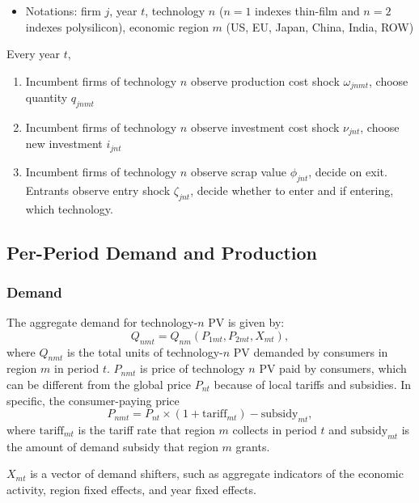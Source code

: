 \documentclass[12pt]{article}
\begin{document}
\begin{itemize}
    \item Notations: firm $j$, year $t$, technology $n$ ($n=1$ indexes thin-film and $n=2$ indexes polysilicon), economic region $m$ (US, EU, Japan, China, India, ROW)
\end{itemize}
Every year $t$,
    \begin{enumerate}
        \item Incumbent firms of technology $n$ observe production cost shock $\omega_{jnmt}$, choose quantity $q_{jnmt}$
        \item Incumbent firms of technology $n$ observe investment cost shock $\nu_{jnt}$, choose new investment $i_{jnt}$
        \item Incumbent firms of technology $n$ observe scrap value $\phi_{jnt}$, decide on exit. Entrants observe entry shock $\zeta_{jnt}$, decide whether to enter and if entering, which technology.
    \end{enumerate}

\subsection{Per-Period Demand and Production}

\subsubsection*{Demand}
The aggregate demand for technology-$n$ PV is given by:
\begin{equation}
Q_{nmt}=Q_{nm}(P_{1mt},P_{2mt},X_{mt}), \label{eq:model_demand}
\end{equation}
where $Q_{nmt}$ is the total units of technology-$n$ PV demanded by consumers in region $m$ in period $t$. $P_{nmt}$ is price of technology $n$ PV paid by consumers, which can be different from the global price $P_{nt}$ because of local tariffs and subsidies. In specific, the consumer-paying price
\[P_{nmt} = P_{nt}\times (1 + \text{tariff}_{mt}) - \text{subsidy}_{mt},\]
where $\text{tariff}_{mt}$ is the tariff rate that region $m$ collects in period $t$ and $\text{subsidy}_{mt}$ is the amount of demand subsidy that region $m$ grants.

$X_{mt}$ is a vector of demand shifters, such as aggregate indicators of the economic activity, region fixed effects, and year fixed effects.
\end{document}
